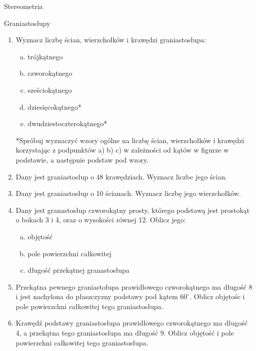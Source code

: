 \documentclass[12pt,a4paper]{article}
\begin{document}
	\begin{center}
		\LARGE Stereometria
	\end{center}
	
	\begin{center}
		\large Graniastosłupy
	\end{center}
	
	\begin{enumerate}[1.]
	\item Wyznacz liczbę ścian, wierzchołków i krawędzi graniastosłupa:
		\begin{enumerate}[a)]
			\item trójkątnego
			\item czworokątnego
			\item sześciokątnego
			\item dziesięcokątnego*
			\item dwudziestoczterokątnego*
		\end{enumerate}
		
	*Spróbuj wyznaczyć wzory ogólne na liczbę ścian, wierzchołków i krawędzi korzystając z podpunktów a) b) c) w zależności od kątów w figurze w podstawie, a następnie podstaw pod wzory.
		
	\item Dany jest graniastosłup o 48 krawędziach. Wyznacz liczbe jego ścian.
	\item Dany jest graniastosłup o 10 ścianach. Wyznacz liczbę jego wierzchołków.
		
	\item Dany jest granastosłup czworokątny prosty, którego podstawą jest prostokąt o bokach 3 i 4, oraz o wysokości równej 12. Oblicz jego:
	\begin{enumerate}[a)]
		\item objętość
		\item pole powierzchni całkowitej
		\item długość przekątnej granastosłupa
	\end{enumerate}
	
	\item Przekątna pewnego graniastołupa prawidłowego czworokątnego ma długość 8 i jest nachylona do płaszczyzny podstawy pod kątem $60^\circ$. Oblicz objętośc i pole powierzchni całkowitej tego graniastosłupa.
	
	\item Krawędź podstawy graniastosłupa prawidłowego czworokątnego ma długość 4, a przekątna tego graniastosłupa ma długość 9. Oblicz objętość i pole powierzchni całkowitej tego graniastosłupa.
	

\end{enumerate}
\end{document}
